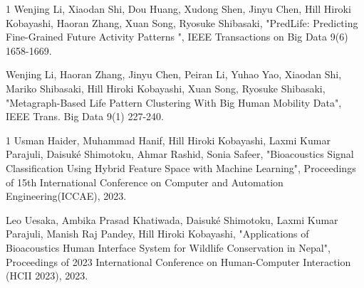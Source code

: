  \begin{雑誌論文}{1}
 Wenjing Li, Xiaodan Shi, Dou Huang, Xudong Shen, Jinyu Chen, Hill Hiroki Kobayashi, Haoran Zhang, Xuan Song, Ryosuke Shibasaki,  "PredLife: Predicting Fine-Grained Future Activity Patterns ", IEEE Transactions on Big Data 9(6) 1658-1669.

 Wenjing Li, Haoran Zhang, Jinyu Chen, Peiran Li, Yuhao Yao, Xiaodan Shi, Mariko Shibasaki, Hill Hiroki Kobayashi, Xuan Song, Ryosuke Shibasaki,  "Metagraph-Based Life Pattern Clustering With Big Human Mobility Data", IEEE Trans. Big Data 9(1) 227-240.
 
 \end{雑誌論文}

 \begin{査読付}{1}
 Usman Haider, Muhammad Hanif, Hill Hiroki Kobayashi, Laxmi Kumar Parajuli, Daisuké Shimotoku, Ahmar Rashid, Sonia Safeer, "Bioacoustics Signal Classification Using Hybrid Feature Space with Machine Learning", Proceedings of 15th International Conference on Computer and Automation Engineering(ICCAE), 2023.  

 Leo Uesaka, Ambika Prasad Khatiwada, Daisuk\'e Shimotoku, Laxmi Kumar Parajuli, Manish Raj Pandey, Hill Hiroki Kobayashi, "Applications of Bioacoustics Human Interface System for Wildlife Conservation in Nepal", Proceedings of 2023 International Conference on Human-Computer Interaction (HCII 2023), 2023.  

 \end{査読付}

